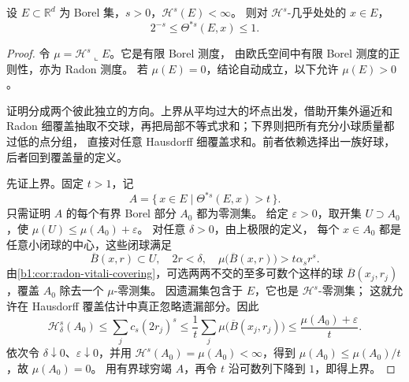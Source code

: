 \begin{theorem}\label{b1:thm:hausdorff-upper-density}
设 \(E\subset\mathbb R^d\) 为 Borel 集，\(s>0\)，\(\mathcal H^s(E)<\infty\)。
则对 \(\mathcal H^s\)-几乎处处的 \(x\in E\)，
\[
 2^{-s}\leq\Theta^{*s}(E,x)\leq1.
\]
\end{theorem}
\begin{proof}
令 \(\mu=\mathcal H^s\llcorner E\)。它是有限 Borel 测度，
由欧氏空间中有限 Borel 测度的正则性，亦为 Radon 测度。
若 \(\mu(E)=0\)，结论自动成立，以下允许 \(\mu(E)>0\)。

证明分成两个彼此独立的方向。上界从平均过大的坏点出发，借助开集外逼近和
Radon 细覆盖抽取不交球，再把局部不等式求和；下界则把所有充分小球质量都过低的点分组，
直接对任意 Hausdorff 细覆盖求和。前者依赖选择出一族好球，后者回到覆盖量的定义。

先证上界。固定 \(t>1\)，记
\[
 A=\{\,x\in E\mid\Theta^{*s}(E,x)>t\,\}.
\]
只需证明 \(A\) 的每个有界 Borel 部分 \(A_0\) 都为零测集。
给定 \(\varepsilon>0\)，取开集 \(U\supset A_0\)，使
\(\mu(U)\leq\mu(A_0)+\varepsilon\)。
对任意 \(\delta>0\)，由上极限的定义，
每个 \(x\in A_0\) 都是任意小闭球的中心，这些闭球满足
\[
 \overline B(x,r)\subset U,\quad 2r<\delta,\quad
 \mu\bigl(\overline B(x,r)\bigr)>t\alpha_s r^s.
\]
由\cref{b1:cor:radon-vitali-covering}，可选两两不交的至多可数个这样的球
\(\overline B(x_j,r_j)\)，覆盖 \(A_0\) 除去一个 \(\mu\)-零测集。
因遗漏集包含于 \(E\)，它也是 \(\mathcal H^s\)-零测集；
这就允许在 Hausdorff 覆盖估计中真正忽略遗漏部分。因此
\[
 \mathcal H^s_\delta(A_0)
 \leq\sum_j c_s(2r_j)^s
 \leq\frac1t\sum_j\mu\bigl(\overline B(x_j,r_j)\bigr)
 \leq\frac{\mu(A_0)+\varepsilon}{t}.
\]
依次令 \(\delta\downarrow0\)、\(\varepsilon\downarrow0\)，并用
\(\mathcal H^s(A_0)=\mu(A_0)<\infty\)，得到
\(\mu(A_0)\leq\mu(A_0)/t\)，故 \(\mu(A_0)=0\)。
用有界球穷竭 \(A\)，再令 \(t\) 沿可数列下降到 \(1\)，即得上界。


\end{proof}
